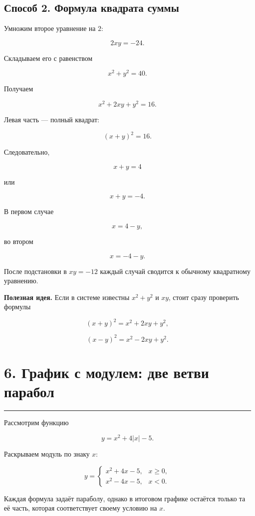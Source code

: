 \documentclass[a4paper,12pt]{article}
\newcommand{\topicline}{
    \textcolor{accent}{\rule{\linewidth}{0.6pt}}
}
\begin{document}
\subsection*{Способ 2. Формула квадрата суммы}

Умножим второе уравнение на $2$:

\[
2xy=-24.
\]

Складываем его с равенством

\[
x^2+y^2=40.
\]

Получаем

\[
x^2+2xy+y^2=16.
\]

Левая часть --- полный квадрат:

\[
(x+y)^2=16.
\]

Следовательно,

\[
x+y=4
\]

или

\[
x+y=-4.
\]

В первом случае

\[
x=4-y,
\]

во втором

\[
x=-4-y.
\]

После подстановки в $xy=-12$
каждый случай сводится к обычному квадратному уравнению.

\textbf{Полезная идея.}
Если в системе известны $x^2+y^2$ и $xy$,
стоит сразу проверить формулы

\[
(x+y)^2
=
x^2+2xy+y^2,
\]

\[
(x-y)^2
=
x^2-2xy+y^2.
\]


\section*{6. График с модулем: две ветви парабол}
\topicline

Рассмотрим функцию

\[
y=x^2+4|x|-5.
\]

Раскрываем модуль по знаку $x$:

\[
y=
\begin{cases}
x^2+4x-5, & x\ge0,\\
x^2-4x-5, & x<0.
\end{cases}
\]

Каждая формула задаёт параболу,
однако в итоговом графике остаётся только та её часть,
которая соответствует своему условию на $x$.
\end{document}
